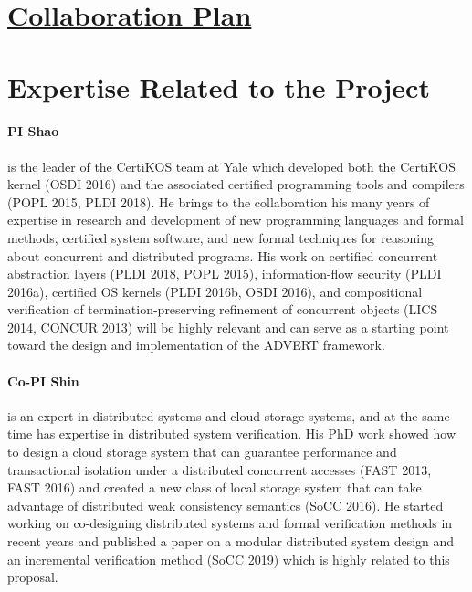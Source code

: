 \documentclass[11pt]{article}
\begin{document}
\thispagestyle{empty}
\section*{\underline{Collaboration Plan}}
\section{Expertise Related to the Project}

\paragraph{PI Shao} is the leader of the CertiKOS team at Yale
which developed both the CertiKOS kernel (OSDI 2016) and the
associated certified programming tools and compilers (POPL 2015, PLDI
2018).  He brings to the collaboration his many years of expertise in
research and development of new programming languages and formal
methods, certified system software, and new formal techniques for
reasoning about concurrent and distributed programs.  His work on
certified concurrent abstraction layers (PLDI 2018, POPL 2015),
information-flow security (PLDI 2016a), certified OS kernels (PLDI
2016b, OSDI 2016), and compositional verification of
termination-preserving refinement of concurrent objects (LICS 2014,
CONCUR 2013) will be highly relevant and can serve as a starting point
toward the design and implementation of the ADVERT framework.

\paragraph{Co-PI Shin} is an expert in distributed systems and 
cloud storage systems, and at the same time
has expertise in distributed system verification. His PhD work
showed how to design a cloud storage system that can guarantee
performance and transactional isolation under a distributed concurrent
accesses (FAST 2013, FAST 2016) and created a new class of
local storage system that can take advantage of distributed weak
consistency semantics (SoCC 2016). He started working on co-designing
distributed systems and formal verification methods
in recent years and published a paper on a modular distributed
system design and an incremental verification method (SoCC 2019) 
which is highly related to this proposal. 
\end{document}
